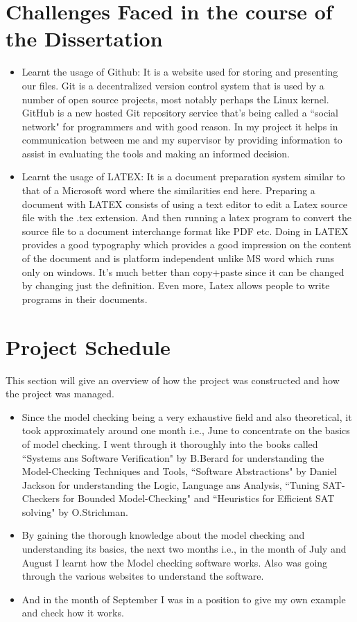 \documentclass[a4paper,12pt]{report}
\begin{document}
\section{Challenges Faced in the course of the Dissertation}
\label{Challenges faced}

\begin{itemize}
\item Learnt the usage of Github: It is a website used for storing and presenting our files. Git is a decentralized version control system that is used by a number of open source projects, most notably perhaps the Linux kernel. GitHub is a new hosted Git repository service that's being called a ``social network" for programmers and with good reason. In my project it helps in communication between me and my supervisor by providing information to assist in evaluating the tools and making an informed decision.
\item Learnt the usage of LATEX: It is a document preparation system similar to that of a Microsoft word where the similarities end here. Preparing a document with LATEX consists of using a text editor to edit a Latex source file with the .tex extension. And then running a latex program to convert the source file to a document interchange format like PDF etc. Doing in LATEX provides a good typography which provides a good impression on the content of the document and is platform independent unlike MS word which runs only on windows. It's much better than copy+paste since it can be changed by changing just the definition. Even more, Latex allows people to write programs in their documents. 
\end{itemize}

\section{Project Schedule}
\label{Project Schd}
This section will give an overview of how the project was constructed and how the project was managed.
\begin{itemize}
\item Since the model checking being a very exhaustive field and also theoretical, it took approximately around one month i.e., June to concentrate on the basics of  model checking. I went through it thoroughly into the books called ``Systems ans Software Verification" by B.Berard for understanding the Model-Checking Techniques and Tools, ``Software Abstractions" by Daniel Jackson for understanding the Logic, Language ans Analysis, ``Tuning SAT-Checkers for Bounded Model-Checking" and ``Heuristics for Efficient SAT solving" by O.Strichman.
\item  By gaining the thorough knowledge about the model checking and understanding its basics, the next two months i.e., in the month of July and August I learnt how the Model checking software works. Also was going through the various websites to understand the software.
\item And in the month of September I was in a position to give my own example and check how it works.
\end{itemize}
\end{document}
